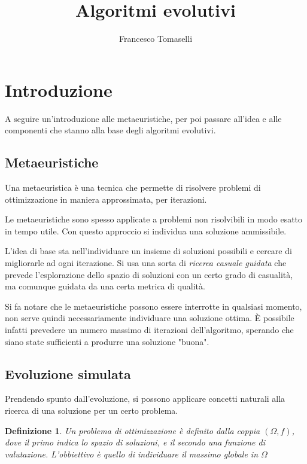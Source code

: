 \documentclass[a4paper]{article}
\title{Algoritmi evolutivi}
\author{Francesco Tomaselli}
\newtheorem{definition}{Definizione}
\begin{document}
\maketitle
\tableofcontents
\setlength{\parindent}{0pt}
\setlength{\parskip}{0.8em}
\newpage
\section{Introduzione}
A seguire un'introduzione alle metaeuristiche, per poi passare all'idea 
e alle componenti che stanno alla base degli algoritmi evolutivi.
\subsection{Metaeuristiche}
Una metaeuristica è una tecnica che permette di risolvere problemi 
di ottimizzazione in maniera approssimata, per iterazioni.

Le metaeuristiche sono spesso applicate a problemi non risolvibili 
in modo esatto in tempo utile. Con questo approccio si individua una soluzione
ammissibile.

L'idea di base sta nell'individuare un insieme di soluzioni possibili e 
cercare di migliorarle ad ogni iterazione. Si usa una sorta di \emph{ricerca casuale guidata}
che prevede l'esplorazione dello spazio di soluzioni con un certo grado di casualità, 
ma comunque guidata da una certa metrica di qualità.

Si fa notare che le metaeuristiche possono essere interrotte in qualsiasi 
momento, non serve quindi necessariamente individuare una soluzione ottima.
È possibile infatti prevedere un numero massimo di iterazioni dell'algoritmo, 
sperando che siano state sufficienti a produrre una soluzione "buona".

\subsection{Evoluzione simulata}
Prendendo spunto dall'evoluzione, si possono applicare concetti naturali alla
ricerca di una soluzione per un certo problema.
\begin{definition}
    Un problema di ottimizzazione è definito dalla coppia $(\Omega, f)$, dove 
    il primo indica lo spazio di soluzioni, e il secondo una funzione di valutazione.
    L'obbiettivo è quello di individuare il massimo globale in $\Omega$
\end{definition}
\end{document}
